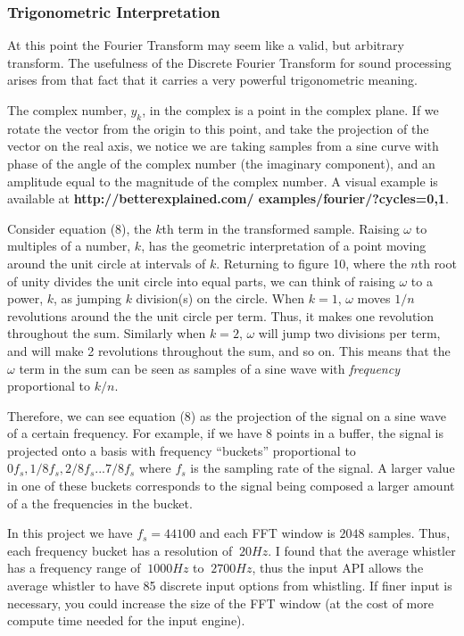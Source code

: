 \documentclass[DIV=calc, paper=a4, fontsize=11pt, twocolumn]{scrartcl}   %
\begin{document}
\subsubsection{Trigonometric Interpretation}

At this point the Fourier Transform may seem like a valid, but arbitrary transform. The usefulness of the Discrete Fourier Transform for sound processing arises from that fact that it carries a very powerful trigonometric meaning.

\par The complex number, $y_k$, in the complex is a point in the complex plane. If we rotate the vector from the origin to this point, and take the projection of the vector on the real axis, we notice we are taking samples from a sine curve with phase of the angle of the complex number (the imaginary component), and an amplitude equal to the magnitude of the complex number. A visual example is available at \textbf{http://betterexplained.com/ examples/fourier/?cycles=0,1}.

Consider equation (8), the $k$th term in the transformed sample. Raising $\omega$ to multiples of a number, $k$, has the geometric interpretation of a point moving around the unit circle at intervals of $k$. Returning to figure 10, where the $n$th root of unity divides the unit circle into equal parts, we can think of raising $\omega$ to a power, $k$, as jumping $k$ division(s) on the circle. When $k = 1$, $\omega$ moves $1/n$ revolutions around the the unit circle per term. Thus, it makes one revolution throughout the sum. Similarly when $k=2$, $\omega$ will jump two divisions per term, and will make 2 revolutions throughout the sum, and so on. This means that the $\omega$ term in the sum can be seen as samples of a sine wave with \textit{frequency} proportional to $k/n$.
\par
Therefore, we can see equation (8) as the projection of the signal on a sine wave of a certain frequency. For example, if we have 8 points in a buffer, the signal is projected onto a basis with frequency ``buckets'' proportional to $0f_s,1/8f_s,2/8f_s...7/8f_s$ where $f_s$ is the sampling rate of the signal. A larger value in one of these buckets corresponds to the signal being composed a larger amount of a the frequencies in the bucket.

\par
In this project we have $f_s=44100$ and each FFT window is $2048$ samples. Thus, each frequency bucket has a resolution of $~20Hz$. I found that the average whistler has a frequency range of $~1000Hz$ to $~2700Hz$, thus the input API allows the average whistler to have 85 discrete input options from whistling. If finer input is necessary, you could increase the size of the FFT window (at the cost of more compute time needed for the input engine).
\end{document}
